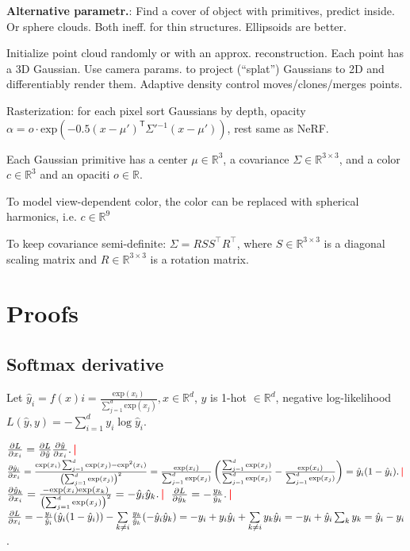\documentclass[11pt,landscape,a4paper,fleqn]{article}
\newcommand*{\tran}{^{\mathsf{T}}} %
\newcommand{\R}{\mathbb{R}}
\renewcommand{\exp}{\mathrm{exp}}
\newcommand{\sep}{\,\textcolor{red}{\bm|}\,}
\begin{document}
\begin{multicols*}{4}
\textbf{Alternative parametr.}:
Find a cover of object with primitives, predict inside.
Or sphere clouds. Both ineff. for thin structures.
Ellipsoids are better.

Initialize point cloud randomly or with an approx. reconstruction.
Each point has a 3D Gaussian.
Use camera params. to project (``splat'') Gaussians to 2D
and differentiably render them.
Adaptive density control moves/clones/merges points.

Rasterization: for each pixel sort Gaussians by depth, opacity
$\alpha = o \cdot \exp( - 0.5(x - \mu')\tran \Sigma'{}^{-1}(x - \mu'))$,
rest same as NeRF.

Each Gaussian primitive has a center $\mu \in \R^3$, a covariance $\Sigma \in \R^{3\times 3}$, and a color $c \in \R^3$ and an opaciti $o \in \R$.

To model view-dependent color, the color can be replaced with spherical harmonics, i.e. $c \in \R^9$

To keep covariance semi-definite: $\Sigma = RSS^\top R^\top$, where $S \in \R^{3\times 3}$ is a diagonal scaling matrix and $R \in \R^{3\times 3}$ is a rotation matrix.

%





\section{Proofs}

\subsection*{Softmax derivative}

Let $\hat{y}_i = f(x)i = \frac{\exp(x_i)}{\sum_{j = 1}^d \exp(x_j)}, x \in \R^d$,
$y$ is 1-hot $\in \R^d$,
negative log-likelihood
$L(\hat{y}, y) = - \sum_{i = 1}^d y_i \log \hat{y}_i$.

$\pdv{L}{x_i} = \pdv{L}{\hat{y}} \pdv{\hat{y}}{x_i}.\sep$
$\pdv{\hat{y}_i}{x_i} = \frac{\exp(x_i) \sum_{j = 1}^d \exp(x_j) - \exp^2(x_i)}{\left(\sum_{j = 1}^d \exp(x_j)\right)^2}
= \frac{\exp(x_i)}{\sum_{j = 1}^d \exp(x_j)} \left(\frac{\sum_{j = 1}^d \exp(x_j)}{\sum_{j = 1}^d \exp(x_j)} - \frac{\exp(x_i)}{\sum_{j = 1}^d \exp(x_j)}\right) = \hat{y}_i(1 - \hat{y}_i). \sep$
$\pdv{\hat{y}_k}{x_i} = \frac{ - \exp(x_i)\exp(x_k)}{\left(\sum_{j = 1}^d \exp(x_j)\right)^2} = - \hat{y}_i \hat{y}_k.\sep$
$\pdv{L}{\hat{y}_k} = - \frac{y_k}{\hat{y}_k}. \sep$
$\pdv{L}{x_i} = - \frac{y_i}{\hat{y}_i} (\hat{y}_i(1 - \hat{y}_i)) - \sum\limits_{k \neq i} \frac{y_k}{\hat{y}_k}( - \hat{y}_i \hat{y}_k) = - y_i + y_i \hat{y}_i + \sum\limits_{k \neq i} y_k \hat{y}_i
= - y_i + \hat{y}_i \sum_k y_k = \hat{y}_i - y_i$.


\end{multicols*}
\end{document}
